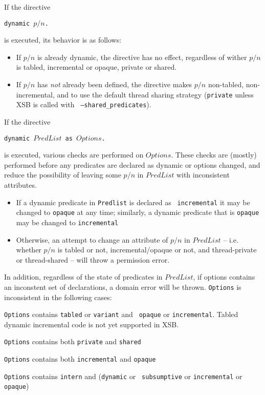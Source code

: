 \begin{description}
If the directive 

{\tt  dynamic $p/n$.}

is executed, its behavior is as follows:
\begin{itemize}
\item If $p/n$ is already dynamic, the directive has no effect,
  regardless of wither $p/n$ is tabled, incremental or opaque, private
  or shared.
%
\item If $p/n$ has {\em not} already been defined, the directive makes
  $p/n$ non-tabled, non-incremental, and to use the default thread
  sharing strategy ({\tt private} unless XSB is called with {\tt
    --shared\_predicates}).
\end{itemize}

If the directive 

{\tt  dynamic $PredList$ as $Options$.}

is executed, various checks are performed on $Options$.  These checks
are (mostly) performed before any predicates are declared as dynamic
or options changed, and reduce the possibility of leaving some $p/n$
in $PredList$ with inconsistent attributes.
%
\begin{itemize}
\item If a dynamic predicate in {\tt Predlist} is declared as {\tt
  incremental} it may be changed to {\tt opaque} at any time;
  similarly, a dynamic predicate that is {\tt opaque} may be changed
  to {\tt incremental}
%
\item Otherwise, an attempt to change an attribute of $p/n$ in
  $PredList$ -- i.e. whether $p/n$ is tabled or not,
  incremental/opaque or not, and thread-private or thread-shared --
  will throw a permission error.
\end{itemize}

In addition, regardless of the state of predicates in $PredList$, if
options contains an inconstent set of declarations, a domain error
will be thrown.  {\tt Options} is inconsistent in the following cases:
%
\bi
\item {\tt Options} contains {\tt tabled} or {\tt variant} and {\tt
  opaque} or {\tt incremental}.  Tabled dynamic incremental code is
  not yet supported in XSB.
%
\item {\tt Options} contains both {\tt private} and {\tt shared}
%
\item {\tt Options} contains both {\tt incremental} and {\tt opaque}
\item {\tt Options} contains {\tt intern} and ({\tt dynamic} or {\tt
subsumptive} or {\tt incremental} or {\tt opaque})
\ei


\end{description}
